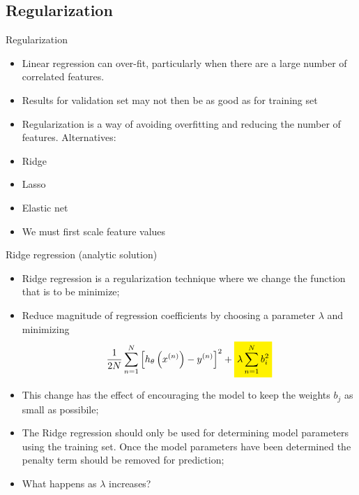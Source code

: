\documentclass[11pt]{beamer}
\newcommand{\highlight}[1]{%
  \colorbox{yellow!100}{$\displaystyle#1$}}
\begin{document}
\subsection[subsection]{Regularization}
%
\begin{frame}{Regularization}
	\begin{itemize}
		\item Linear regression can over-fit, particularly when there are a large number of correlated features.
		\item Results for validation set may not then be as good as for training set
		\item Regularization is a way of avoiding overfitting and reducing the number of features. Alternatives:
		\item Ridge 
		\item Lasso
		\item Elastic net
		\item We must first scale feature values
	\end{itemize}
\end{frame}
\begin{frame}{Ridge regression (analytic solution)}
	\begin{itemize}
\item Ridge regression is a regularization technique where we change the function that is to be minimize;	
		\item Reduce magnitude of regression coefficients by choosing a parameter $\lambda$ and minimizing
		\begin{equation}
		\frac{1}{2N} \sum\limits_{n=1}^N \left[h_\theta \left( x^{(n)} \right) - y ^{(n)}\right]^2	+ \highlight{\lambda \sum\limits_{n=1}^N b_i^2}
		\end{equation}
		\item This change has the effect of encouraging the model to keep the weights $b_j$ as small as possibile;
		\item The Ridge regression should only be used for determining model parameters using the training set. Once the model parameters have been determined the penalty term should be removed for prediction;
		\item What happens as $\lambda$ increases?
	\end{itemize}
\end{frame}
\end{document}
